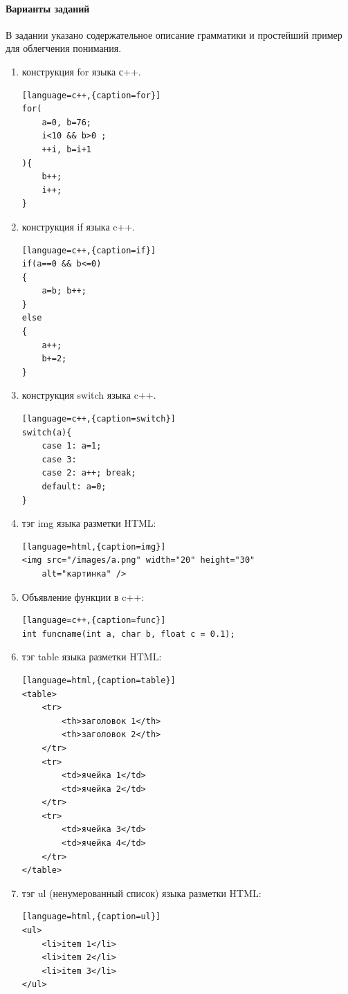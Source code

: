 \documentclass[a4paper,12pt]{article}
\begin{document}
\paragraph{Варианты заданий}
В задании указано содержательное описание грамматики и простейший пример для облегчения понимания.
\begin{enumerate}
	\item конструкция for языка с++. 
\begin{lstlisting}[language=c++,{caption=for}]
for(
	a=0, b=76; 
	i<10 && b>0 ;
	++i, b=i+1
){ 
	b++;
	i++;
}
\end{lstlisting}

	\item конструкция if языка c++. 
\begin{lstlisting}[language=c++,{caption=if}]
if(a==0 && b<=0)
{
	a=b; b++;
}
else
{
	a++; 
	b+=2;
}
\end{lstlisting}

	\item конструкция switch языка c++. 
\begin{lstlisting}[language=c++,{caption=switch}]
switch(a){ 
	case 1: a=1; 
	case 3: 
	case 2: a++; break; 
	default: a=0;
}
\end{lstlisting}

	\item тэг img языка разметки HTML: 
\begin{lstlisting}[language=html,{caption=img}]
<img src="/images/a.png" width="20" height="30" 
	alt="картинка" />
\end{lstlisting}

	\item Объявление функции в c++:
\begin{lstlisting}[language=c++,{caption=func}]
int funcname(int a, char b, float c = 0.1);
\end{lstlisting}

	\item тэг table языка разметки HTML: 
\begin{lstlisting}[language=html,{caption=table}]
<table>
	<tr>
		<th>заголовок 1</th>
		<th>заголовок 2</th>
	</tr>
	<tr>
		<td>ячейка 1</td>
		<td>ячейка 2</td>
	</tr>
	<tr>
		<td>ячейка 3</td>
		<td>ячейка 4</td>
	</tr>
</table>
\end{lstlisting}

	\item тэг ul (ненумерованный список) языка разметки HTML: 
\begin{lstlisting}[language=html,{caption=ul}]
<ul>
	<li>item 1</li>
	<li>item 2</li>
	<li>item 3</li>
</ul>
\end{lstlisting}


\end{enumerate}
\end{document}
